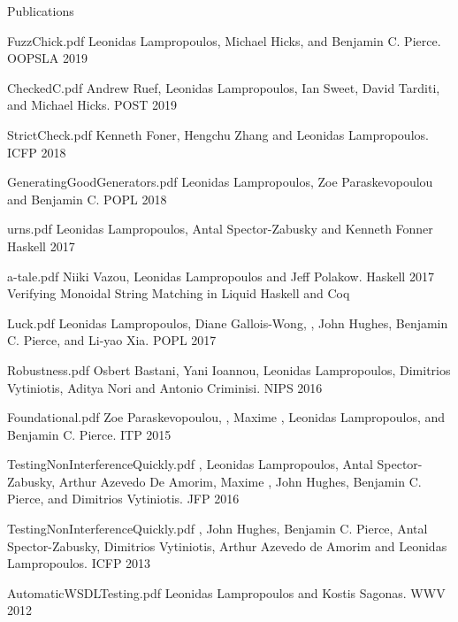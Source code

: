 \documentclass{resume} %
\begin{document}
\begin{rSection}{Publications}

    {FuzzChick.pdf}
    {Leonidas Lampropoulos, Michael Hicks, and Benjamin C. Pierce.}
    {OOPSLA 2019}
    
    {CheckedC.pdf}
    {Andrew Ruef, Leonidas Lampropoulos, Ian Sweet, David Tarditi, and Michael Hicks.}
    {POST 2019}


    {StrictCheck.pdf}
    {Kenneth Foner, Hengchu Zhang and Leonidas Lampropoulos.}
    {ICFP 2018}

    {GeneratingGoodGenerators.pdf}
    {Leonidas Lampropoulos, Zoe Paraskevopoulou and Benjamin C.}
    {POPL 2018}

    {urns.pdf}
    {Leonidas Lampropoulos, Antal Spector-Zabusky and Kenneth Fonner}
    {Haskell 2017}


    {a-tale.pdf}
    {Niiki Vazou, Leonidas Lampropoulos and Jeff Polakow.}
    {Haskell 2017}
    {Verifying Monoidal String Matching in Liquid Haskell and Coq}

    {Luck.pdf}
    {Leonidas Lampropoulos, Diane Gallois-Wong, \Catalin \Hritcu, John Hughes, Benjamin C. Pierce, and Li-yao Xia.}
    {POPL 2017}


    {Robustness.pdf}
    {Osbert Bastani, Yani Ioannou, Leonidas Lampropoulos, Dimitrios Vytiniotis, Aditya Nori and Antonio Criminisi.}
    {NIPS 2016}


    {Foundational.pdf}
    {Zoe Paraskevopoulou, \Catalin \Hritcu, Maxime \Denes, Leonidas Lampropoulos, and Benjamin C. Pierce.}
    {ITP 2015}

    {TestingNonInterferenceQuickly.pdf}
    {\Catalin \Hritcu, Leonidas Lampropoulos, Antal Spector-Zabusky, Arthur
    Azevedo De Amorim, Maxime \Denes, John Hughes, Benjamin C. Pierce, and Dimitrios
    Vytiniotis.}
    {JFP 2016}

    {TestingNonInterferenceQuickly.pdf}
    {\Catalin \Hritcu, John Hughes, Benjamin C. Pierce, Antal
      Spector-Zabusky, Dimitrios Vytiniotis, Arthur Azevedo de Amorim
      and Leonidas Lampropoulos.}
    {ICFP 2013}

    {AutomaticWSDLTesting.pdf}
    {Leonidas Lampropoulos and Kostis Sagonas.}
    {WWV 2012}
   
\end{rSection}
\end{document}
